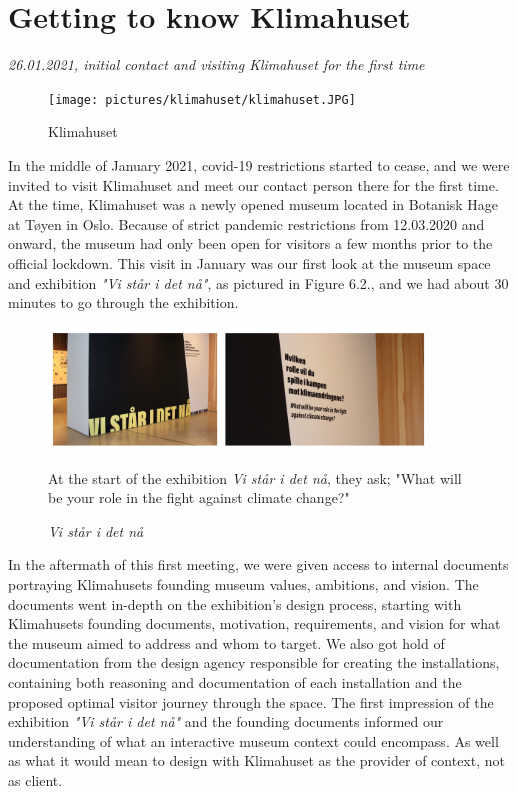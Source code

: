 \section{Getting to know Klimahuset}
\par
\emph{26.01.2021, initial contact and visiting Klimahuset for the first time}
\par

\begin{figure}[H]
\centering
\texttt{[image: pictures/klimahuset/klimahuset.JPG]}
\caption{Klimahuset}
\end{figure}

In the middle of January 2021, covid-19 restrictions started to cease, and we were invited to visit Klimahuset and meet our contact person there for the first time. At the time, Klimahuset was a newly opened museum located in Botanisk Hage at Tøyen in Oslo. Because of strict pandemic restrictions from 12.03.2020 and onward, the museum had only been open for visitors a few months prior to the official lockdown. This visit in January was our first look at the museum space and exhibition \emph{"Vi står i det nå"}, as pictured in Figure 6.2., and we had about 30 minutes to go through the exhibition.

\begin{figure}[H]
\centering
\includegraphics[width=10cm]{pictures/process/staar_i_det_naa.png}
\caption{\textit{Vi står i det nå}}{At the start of the exhibition \emph{Vi står i det nå}, they ask; "What will be your role in the fight against climate change?"}
\end{figure}

In the aftermath of this first meeting, we were given access to internal documents portraying Klimahusets founding museum values, ambitions, and vision. The documents went in-depth on the exhibition's design process, starting with Klimahusets founding documents, motivation, requirements, and vision for what the museum aimed to address and whom to target. We also got hold of documentation from the design agency responsible for creating the installations, containing both reasoning and documentation of each installation and the proposed optimal visitor journey through the space. The first impression of the exhibition \emph{"Vi står i det nå"} and the founding documents informed our understanding of what an interactive museum context could encompass. As well as what it would mean to design with Klimahuset as the provider of context, not as client.

